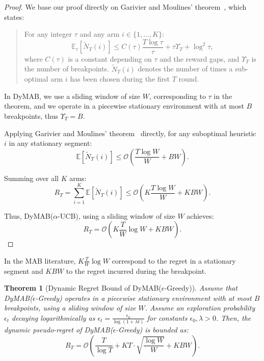 \documentclass[review]{jair}
\newtheorem{theorem}{Theorem}
\begin{document}
\begin{proof}
We base our proof directly on Garivier and Moulines' theorem~\cite[Theorem 7]{Non-Stationary}, which states:
\begin{quote}
For any integer $\tau$ and any arm $i \in \{1, \ldots, K\}$:
\begin{equation}
\mathbb{E}_\tau\left[\tilde{N}_T(i)\right] \leq C(\tau) \frac{T \log \tau}{\tau} + \tau \Upsilon_T + \log^2 \tau,
\end{equation}
where $C(\tau)$ is a constant depending on $\tau$ and the reward gaps, and $\Upsilon_T$ is the number of breakpoints. $\tilde{N}_T(i)$ denotes the number of times a sub-optimal arm $i$ has been chosen during the first $T$ round.
\end{quote}
In DyMAB, we use a sliding window of size $W$, corresponding to $\tau$ in the theorem, and we operate in a piecewise stationary environment with at most $B$ breakpoints, thus $\Upsilon_T = B$.

\noindent {}

Applying Garivier and Moulines' theorem~\cite[Theorem 7]{Non-Stationary} directly, for any suboptimal heuristic $i$ in any stationary segment:
\begin{equation}
\mathbb{E}\left[\tilde{N}_T(i)\right] \leq \mathcal{O}\left(\frac{T \log W}{W} + BW\right).
\end{equation}

\noindent {}

Summing over all $K$ arms:
\begin{equation}
R_T = \sum_{i=1}^K \mathbb{E}\left[\tilde{N}_T(i)\right] \leq \mathcal{O}\left(K \frac{T \log W}{W} + KBW\right).
\end{equation}


\noindent {}

Thus, DyMAB($\alpha$-UCB), using a sliding window of size $W$ achieves:
\begin{equation}
R_T = \mathcal{O}\left(K \frac{T}{W} \log W + KBW\right).
\end{equation}
\end{proof}

In the MAB literature, $K \frac{T}{W} \log W$ correspond to the regret in a stationary segment and $KBW$ to the regret incurred during the breakpoint.


\begin{theorem}[Dynamic Regret Bound of DyMAB($\epsilon$-Greedy)]
Assume that DyMAB($\epsilon$-Greedy) operates in a piecewise stationary environment with at most $B$ breakpoints, using a sliding window of size $W$. Assume an exploration probability $\epsilon_t$ decaying logarithmically as $\epsilon_t = \frac{\epsilon_0}{\log(1 + \lambda t)}$ for constants $\epsilon_0, \lambda > 0$. Then, the dynamic pseudo-regret of DyMAB($\epsilon$-Greedy) is bounded as:
\begin{equation}
R_T = \mathcal{O}\left( \frac{T}{\log T} + K T \cdot \sqrt{\frac{\log W}{W}} + K B W \right).
\end{equation}
\end{theorem}
\end{document}
